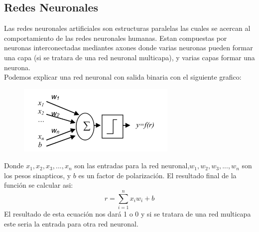 \documentclass[conference]{IEEEtran}
\begin{document}
 \subsection{Redes Neuronales}
 Las redes neuronales artificiales son estructuras paralelas las cuales se acercan al comportamiento de las redes neuronales humanas. Estan compuestas por neuronas  interconectadas mediantes axones donde varias neuronas pueden formar una capa (si se tratara de una red neuronal multicapa), y varias capas formar una neurona.\\
 Podemos explicar una red neuronal con salida binaria con el siguiente grafico:\\
 \begin{figure}
\centering
\includegraphics[width=3.0in]{imagen4.pdf}

\label{fig_mar}
\end{figure}
Donde $x_1,x_2,x_3,...,x_n$ son las entradas para la red neuronal,$w_1,w_2,w_3,...,w_n$  son los pesos sinapticos, y $b$ es un factor de polarizaci\'on. El resultado final de la funci\'on se calcular asi: 
\begin{equation}
r= \sum_{i=1}^{n}x_iw_i+b
\end{equation}
El resultado de esta ecuaci\'on  nos dar\'a 1 o 0 y si se tratara de una red multicapa este seria la entrada para otra red neuronal.\cite{art_red1}
\end{document}
